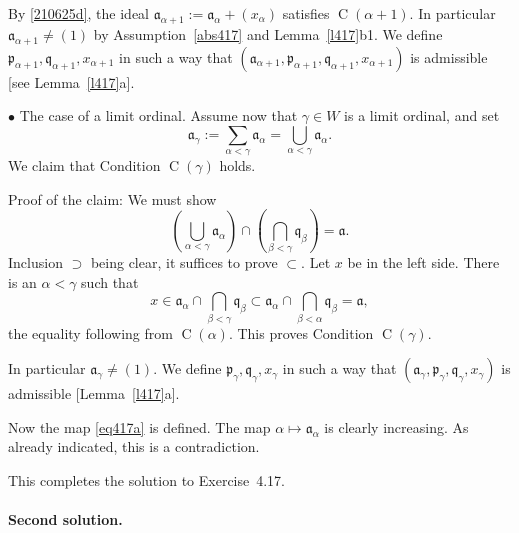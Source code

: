 \documentclass[12pt,letterpaper]{article}%
\newcommand{\oo}{\operatorname}\newcommand{\ooo}{\operatorname*}
\newcommand{\mf}{\mathfrak}
\newcommand{\aaa}{\mf a}
\newcommand{\ppp}{\mf p}
\newcommand{\qqq}{\mf q}
\newcommand{\bu}{\bullet}
\newcommand{\nn}{\noindent}
\begin{document}

By \eqref{210625d}, the ideal $\aaa_{\alpha+1}:=\aaa_\alpha+(x_\alpha)$ satisfies $\oo C(\alpha+1)$. In particular $\aaa_{\alpha+1}\ne(1)$ by Assumption~\eqref{abs417} and Lemma~\ref{l417}b1. We define $\ppp_{\alpha+1},\qqq_{\alpha+1},x_{\alpha+1}$ in such a way that $(\aaa_{\alpha+1},\ppp_{\alpha+1},\qqq_{\alpha+1},x_{\alpha+1})$ is admissible [see Lemma~\ref{l417}a].%

\nn$\bu$ The case of a limit ordinal. Assume now that $\gamma\in W$ is a limit ordinal, and set 
$$
\aaa_\gamma:=\sum_{\alpha<\gamma}\aaa_\alpha=\bigcup_{\alpha<\gamma}\aaa_\alpha.
$$ 
We claim that Condition $\oo C(\gamma)$ holds.

\nn Proof of the claim: We must show 
$$
\left(\bigcup_{\alpha<\gamma}\aaa_\alpha\right)\cap\left(\bigcap_{\beta<\gamma}\qqq_\beta\right)=\aaa.
$$ 
Inclusion $\supset$ being clear, it suffices to prove $\subset$. Let $x$ be in the left side. There is an $\alpha<\gamma$ such that 
$$
x\in\aaa_\alpha\cap\bigcap_{\beta<\gamma}\qqq_\beta\subset\aaa_\alpha\cap\bigcap_{\beta<\alpha}\qqq_\beta=\aaa,
$$ 
the equality following from $\oo C(\alpha)$. This proves Condition $\oo C(\gamma)$. 

In particular $\aaa_\gamma\ne(1)$. We define $\ppp_\gamma,\qqq_\gamma,x_\gamma$ in such a way that $(\aaa_\gamma,\ppp_\gamma,\qqq_\gamma,x_\gamma)$ is admissible [Lemma~\ref{l417}a].

Now the map \eqref{eq417a} is defined. The map $\alpha\mapsto\aaa_\alpha$ is clearly increasing. As already indicated, this is a contradiction.

This completes the solution to Exercise~4.17. 

\paragraph{Second solution.}\label{for418}%
\end{document}
